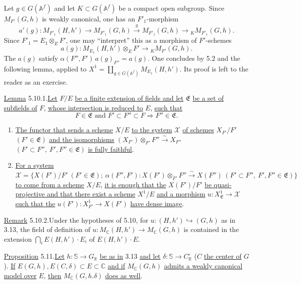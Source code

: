 \documentclass[10pt]{article}
\newcommand{\Af}{\mathbb A^f}
\newcommand{\C}{\mathbb C}
\newcommand{\R}{\mathbb R}
\newcommand{\bS}{\mathbb S}
\newcommand{\MC}{M_{\C}}
\begin{document}
Let $g\in G(\Af)$ and let $K\subset G(\Af)$ be a compact open subgroup. Since $M_{F'}(G,h)$ is weakly canonical, one has an $F'_1$-morphism
\[
a'(g):M_{F'_1}(H,h')\longrightarrow M_{F'_1}(G,h)
 \xrightarrow{\ g\ } M_{F'_1}(G,h)
 \longrightarrow {}_K M_{F'_1}(G,h).
\]
Since $F'_1=E_1\otimes_EF'$, one may ``interpret'' this as a morphism of $F'$-schemes
\[
a(g):M_{E_1}(H,h')\otimes_EF'\longrightarrow {}_K M_{F'}(G,h).
\]
The $a(g)$ satisfy $\alpha(F'',F')\,a(g)_{F''}=a(g)$. One concludes by 5.2 and the following lemma, applied to $X^1=\coprod_{g\in G(\Af)}M_{E_1}(H,h')$. Its proof is left to the reader as an exercise.

\noindent \uline{Lemma} 5.10.1.\quad \uline{Let} $F/E$ \uline{be a finite extension of fields and let} $\mathfrak E$ \uline{be a set of subfields of} $F$, \uline{whose intersection is reduced to} $E$, \uline{such that}
\[
F\in\mathfrak E\text{ and }F'\subset F''\subset F\Longrightarrow F''\in\mathfrak E.
\]
\begin{enumerate}[label=(\roman*)]
\item \uline{The functor that sends a scheme} $X/E$ \uline{to the system} $\mathcal X$ \uline{of schemes} $X_{F'}/F'$ $(F'\in\mathfrak E)$ \uline{and the isomorphisms} $(X_{F'})\otimes_{F'}F''\xrightarrow{\sim}X_{F''}$ $(F'\subset F'',\ F',F''\in\mathfrak E)$ \uline{is fully faithful}.
\item \uline{For a system} $\mathcal X=\{X(F')/F'\ (F'\in\mathfrak E);\allowbreak\ \alpha(F'',F'):X(F')\otimes_{F'}F''\xrightarrow{\sim}X(F'')\allowbreak\ (F'\subset F'',\ F',F''\in\mathfrak E)\}$ \uline{to come from a scheme} $X/E$, \uline{it is enough that the} $X(F')/F'$ \uline{be quasi-projective and that there exist a scheme} $X^1/E$ \uline{and a morphism} $u:X^1_{\mathfrak E}\longrightarrow\mathcal X$ \uline{such that the} $u(F'):X^1_{F'}\longrightarrow X(F')$ \uline{have dense image}.
\end{enumerate}

\noindent \uline{Remark} 5.10.2.\quad Under the hypotheses of 5.10, for $u:(H,h')\hookrightarrow(G,h)$ as in 3.13, the field of definition of $u:\MC(H,h')\longrightarrow\MC(G,h)$ is contained in the extension $\bigcap_i E(H,h')\cdot E_i$ of $E(H,h')\cdot E$.

\noindent \uline{Proposition} 5.11.\quad \uline{Let} $h:\bS\longrightarrow G_\R$ \uline{be as in} 3.13 \uline{and let} $\delta:\bS\longrightarrow C^\circ_\R$ ($C$ \uline{the center of} $G$). \uline{If} $E(G,h),E(C,\delta)\subset E\subset\C$ \uline{and if} $\MC(G,h)$ \uline{admits a weakly canonical model over} $E$, \uline{then} $\MC(G,h.\delta)$ \uline{does as well}.
\end{document}
